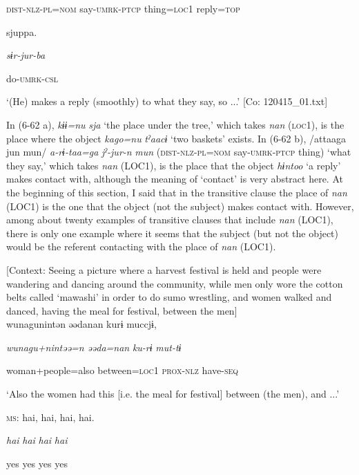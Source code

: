       \textsc{dist}-\textsc{nlz}-\textsc{pl}=\textsc{nom}  say-\textsc{umrk}-\textsc{ptcp}  thing=\textsc{loc}1  reply=\textsc{top}

      sjuppa.

      \textit{sɨr-jur-ba}

      do-\textsc{umrk}-\textsc{csl}

\glt ‘(He) makes a reply (smoothly) to what they say, so ...’ [Co: 120415\_01.txt]
\z

In (6-62 a), \textit{kɨɨ=nu} \textit{sja} ‘the place under the tree,’ which takes \textit{nan} (\textsc{loc}1), is the place where the object \textit{kago=nu} \textit{tˀaacɨ} ‘two baskets’ exists. In (6-62 b), /attaaga jun mun/ \textit{a-rɨ-taa=ga} \textit{jˀ-jur-n} \textit{mun} (\textsc{dist}-\textsc{nlz}-\textsc{pl}=\textsc{nom} say-\textsc{umrk}-\textsc{ptcp} thing) ‘what they say,’ which takes \textit{nan} (LOC1), is the place that the object \textit{hɨntoo} ‘a reply’ makes contact with, although the meaning of ‘contact’ is very abstract here. At the beginning of this section, I said that in the transitive clause the place of \textit{nan} (LOC1) is the one that the object (not the subject) makes contact with. However, among about twenty examples of transitive clauses that include \textit{nan} (LOC1), there is only one example where it seems that the subject (but not the object) would be the referent contacting with the place of \textit{nan} (LOC1).

\ea\label{ex:6-63}
 [Context: Seeing a picture where a harvest festival is held and people were wandering and dancing around the community, while men only wore the cotton belts called ‘mawashi’ in order to do sumo wrestling, and women walked and danced, having the meal for festival, between the men]\\

{\TM}
\gll wunagunintən  əədanan  kurɨ  muccjɨ,

    \textit{wunagu+nintəə=n}  \textit{əəda=nan}  \textit{ku-rɨ}  \textit{mut-tɨ}

    woman+people=also  between=\textsc{loc}1  \textsc{prox}-\textsc{nlz}  have-\textsc{seq}

\glt    ‘Also the women had this [i.e. the meal for festival] between (the men), and ...’

  \textsc{ms}:  {\textbar}hai,  hai,  hai,  hai.{\textbar}

    \textit{hai}  \textit{hai}  \textit{hai}  \textit{hai}

    yes  yes  yes  yes

